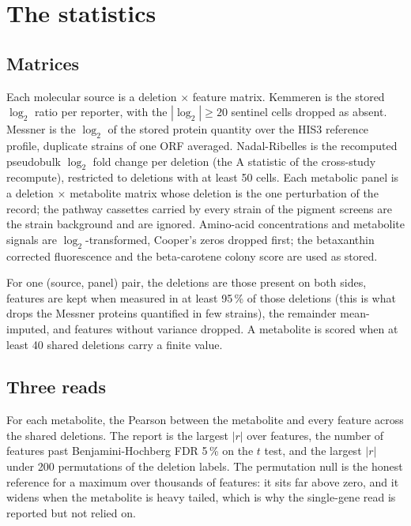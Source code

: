 
\section{The statistics}
\label{sec:methods}

\subsection{Matrices}
\label{sec:methods-matrices}

Each molecular source is a deletion $\times$ feature matrix. Kemmeren is the stored
$\log_2$ ratio per reporter, with the $|\log_2| \ge 20$ sentinel cells dropped as absent.
Messner is the $\log_2$ of the stored protein quantity over the HIS3 reference profile,
duplicate strains of one ORF averaged. Nadal-Ribelles is the recomputed pseudobulk
$\log_2$ fold change per deletion (the A statistic of the cross-study recompute),
restricted to deletions with at least 50 cells. Each metabolic panel is a deletion
$\times$ metabolite matrix whose deletion is the one  perturbation
of the record; the pathway cassettes carried by every strain of the pigment screens
are the strain background and are ignored. Amino-acid concentrations and metabolite
signals are $\log_2$-transformed, Cooper's zeros dropped first; the betaxanthin
corrected fluorescence and the beta-carotene colony score are used as stored.

For one (source, panel) pair, the deletions are those present on both sides, features
are kept when measured in at least 95\,\% of those deletions (this is what drops the
Messner proteins quantified in few strains), the remainder mean-imputed, and features
without variance dropped. A metabolite is scored when at least 40 shared deletions carry
a finite value.

\subsection{Three reads}
\label{sec:methods-reads}

 For each metabolite, the Pearson between the metabolite and every
feature across the shared deletions. The report is the largest $|r|$ over features, the
number of features past Benjamini-Hochberg FDR 5\,\% on the $t$ test, and the largest
$|r|$ under 200 permutations of the deletion labels. The permutation null is the
honest reference for a maximum over thousands of features: it sits far above zero, and
it widens when the metabolite is heavy tailed, which is why the single-gene read is
reported but not relied on.

